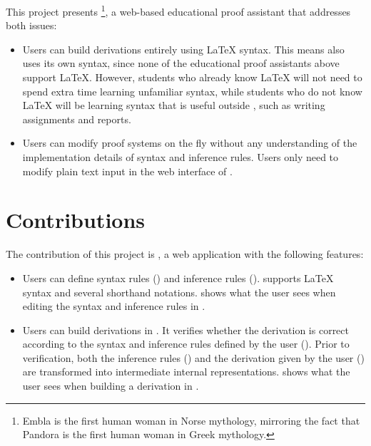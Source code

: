 This project presents \projectname{}\footnote{Embla is the first human woman in Norse mythology, mirroring the fact that Pandora is the first human woman in Greek mythology.}, a web-based educational proof assistant that addresses both issues:
\begin{itemize}
    \item Users can build derivations entirely using \LaTeX{} syntax. This means \projectname{} also uses its own syntax, since none of the educational proof assistants above support \LaTeX{}. However, students who already know \LaTeX{} will not need to spend extra time learning unfamiliar syntax, while students who do not know \LaTeX{} will be learning syntax that is useful outside \projectname{}, such as writing assignments and reports.
    \item Users can modify proof systems on the fly without any understanding of the implementation details of syntax and inference rules. Users only need to modify plain text input in the web interface of \projectname{}.
\end{itemize}

\section{Contributions}
The contribution of this project is \projectname{}, a web application with the following features:
\begin{itemize}
    \item Users can define syntax rules () and inference rules (). \projectname{} supports \LaTeX{} syntax and several shorthand notations.  shows what the user sees when editing the syntax and inference rules in \projectname{}.
    \item Users can build derivations in \projectname{}. It verifies whether the derivation is correct according to the syntax and inference rules defined by the user (). Prior to verification, both the inference rules () and the derivation given by the user () are transformed into intermediate internal representations.  shows what the user sees when building a derivation in \projectname{}.
\end{itemize}

